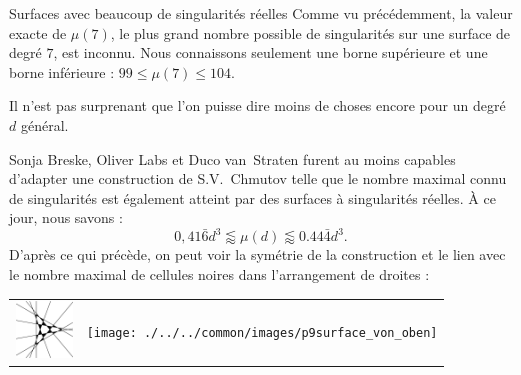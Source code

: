 \begin{surferPage}[216 Singularités]{Surfaces avec beaucoup de singularités réelles}
    Comme vu précédemment, la valeur exacte de $\mu(7)$, le plus grand nombre possible
    de singularités sur une surface de degré $7$, est inconnu.
    Nous connaissons seulement une borne supérieure et une borne inférieure : $99\le \mu(7) \le 104$. 


    Il n'est pas surprenant que l'on puisse dire moins de choses encore pour un degré $d$ général.

    Sonja Breske, Oliver Labs et Duco van~Straten furent au moins capables d'adapter
    une construction de S.V.\ Chmutov telle que le nombre maximal connu
    de singularités est également atteint par des surfaces à 
    singularités réelles. 
    \`A ce jour, nous savons :
    \[0,41\bar{6}d^3 \lessapprox \mu(d) \lessapprox 0.44\bar{4} d^3.\]
     D'après ce qui précède, on peut voir la symétrie de la construction et le lien avec 
    le nombre maximal de cellules noires dans l'arrangement de droites :
    \begin{center}
      \begin{tabular}{c@{\qquad}c}
        \includegraphics[height=1.5cm]{./../../common/images/vielesing.pdf}
        &
        \texttt{[image: ./../../common/images/p9surface\_von\_oben]}
      \end{tabular}
    \end{center}
\end{surferPage}
